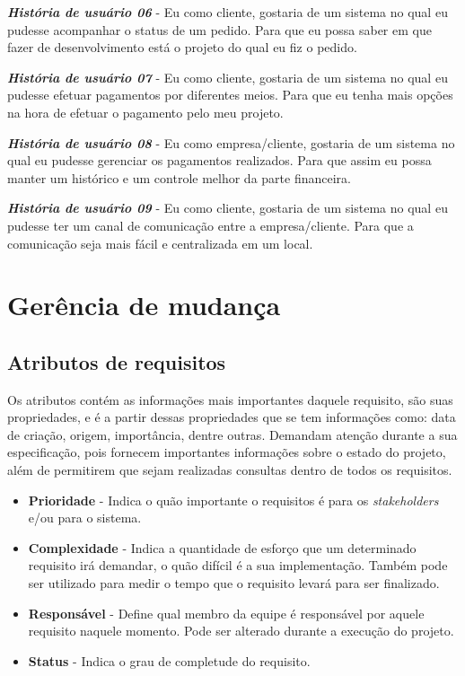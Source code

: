 \textbf{\textit{História de usuário 06}} - Eu como cliente, gostaria de um sistema no qual eu pudesse acompanhar o status de um pedido. Para que eu possa saber em que fazer de desenvolvimento está o projeto do qual eu fiz o pedido.

\textbf{\textit{História de usuário 07}} - Eu como cliente, gostaria de um sistema no qual eu pudesse efetuar pagamentos por diferentes meios. Para que eu tenha mais opções na hora de efetuar o pagamento pelo meu projeto.

\textbf{\textit{História de usuário 08}} - Eu como empresa/cliente, gostaria de um sistema no qual eu pudesse gerenciar os pagamentos realizados. Para que assim eu possa manter um histórico e um controle melhor da parte financeira.

\textbf{\textit{História de usuário 09}} - Eu como cliente, gostaria de um sistema no qual eu pudesse ter um canal de comunicação entre a empresa/cliente. Para que a comunicação seja mais fácil e centralizada em um local.

\section{Gerência de mudança}
\subsection{Atributos de requisitos}
Os atributos contém as informações mais importantes daquele requisito, são suas propriedades, e é a partir dessas propriedades que se tem informações como: data de criação, origem, importância, dentre outras. Demandam atenção durante a sua especificação, pois fornecem importantes informações sobre o estado do projeto, além de permitirem que sejam realizadas consultas dentro de todos os requisitos.
\begin{itemize}
\item \textbf{Prioridade} - Indica o quão importante o requisitos é para os \textit{stakeholders} e/ou para o sistema.
\item \textbf{Complexidade} - Indica a quantidade de esforço que um determinado requisito irá demandar, o quão difícil é a sua implementação. Também pode ser utilizado para medir o tempo que o requisito levará para ser finalizado.
\item \textbf{Responsável} - Define qual membro da equipe é responsável por aquele requisito naquele momento. Pode ser alterado durante a execução do projeto.
\item \textbf{Status} - Indica o grau de completude do requisito.
\end{itemize}
